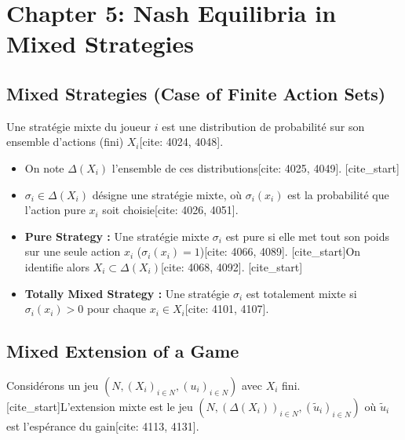 
\section{Chapter 5: Nash Equilibria in Mixed Strategies}

\subsection{Mixed Strategies (Case of Finite Action Sets)}

\begin{definition}Une stratégie mixte du joueur $i$ est une distribution de probabilité sur son ensemble d'actions (fini) $X_i$[cite: 4024, 4048].
\begin{itemize}
    [cite_start]\item On note $\Delta(X_i)$ l'ensemble de ces distributions[cite: 4025, 4049].
    [cite_start]\item $\sigma_i \in \Delta(X_i)$ désigne une stratégie mixte, où $\sigma_i(x_i)$ est la probabilité que l'action pure $x_i$ soit choisie[cite: 4026, 4051].
\end{itemize}
\end{definition}

\begin{itemize}
    [cite_start]\item \textbf{Pure Strategy :} Une stratégie mixte $\sigma_i$ est pure si elle met tout son poids sur une seule action $x_i$ ($\sigma_i(x_i)=1$)[cite: 4066, 4089]. [cite_start]On identifie alors $X_i \subset \Delta(X_i)$[cite: 4068, 4092].
    [cite_start]\item \textbf{Totally Mixed Strategy :} Une stratégie $\sigma_i$ est totalement mixte si $\sigma_i(x_i) > 0$ pour chaque $x_i \in X_i$[cite: 4101, 4107].
\end{itemize}

\subsection{Mixed Extension of a Game}

\begin{definition}
Considérons un jeu $(N, (X_i)_{i \in N}, (u_i)_{i \in N})$ avec $X_i$ fini. [cite_start]L'extension mixte est le jeu $(N, (\Delta(X_i))_{i \in N}, (\tilde{u}_i)_{i \in N})$ où $\tilde{u}_i$ est l'espérance du gain[cite: 4113, 4131].
\end{definition}

